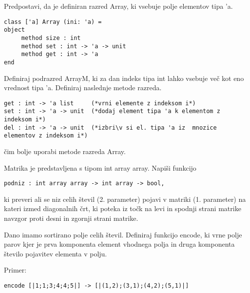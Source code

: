 \begin{ex}
Predpostavi, da je definiran razred Array, ki vsebuje polje elementov tipa 'a. 

\begin{lstlisting}
class ['a] Array (ini: 'a) =
object 
     method size : int
     method set : int -> 'a -> unit
     method get : int -> 'a
end
\end{lstlisting}
Definiraj podrazred ArrayM, ki za dan indeks tipa int lahko vsebuje ve\v c kot eno vrednost tipa 'a.  Definiraj naslednje metode razreda. 
\begin{lstlisting}
get : int -> 'a list     (*vrni elemente z indeksom i*) 
set : int -> 'a -> unit  (*dodaj element tipa 'a k elementom z indeksom i*)
del : int -> 'a -> unit  (*izbri\v si el. tipa 'a iz  mnozice elementov z indeksom i*)
\end{lstlisting}
\v cim bolje uporabi metode razreda Array. 
\end{ex} 




\begin{ex}
Matrika je predstavljena s tipom int array array. Napi\v si funkcijo 
\begin{lstlisting}
podniz : int array array -> int array -> bool,
\end{lstlisting}
ki preveri ali se niz celih \v stevil (2. parameter) pojavi v matriki (1. parameter) na kateri izmed diagonalnih \v crt, ki poteka iz to\v ck na levi in spodnji strani matrike navzgor proti desni in zgornji strani matrike.
\end{ex} 




\begin{ex}
Dano imamo sortirano polje celih \v stevil. Definiraj funkcijo encode, ki vrne polje parov kjer je prva komponenta element vhodnega polja in druga komponenta \v stevilo pojavitev elementa v polju.   

Primer:
\begin{lstlisting}
encode [|1;1;3;4;4;5|] -> [|(1,2);(3,1);(4,2);(5,1)|]
\end{lstlisting}
\end{ex} 




